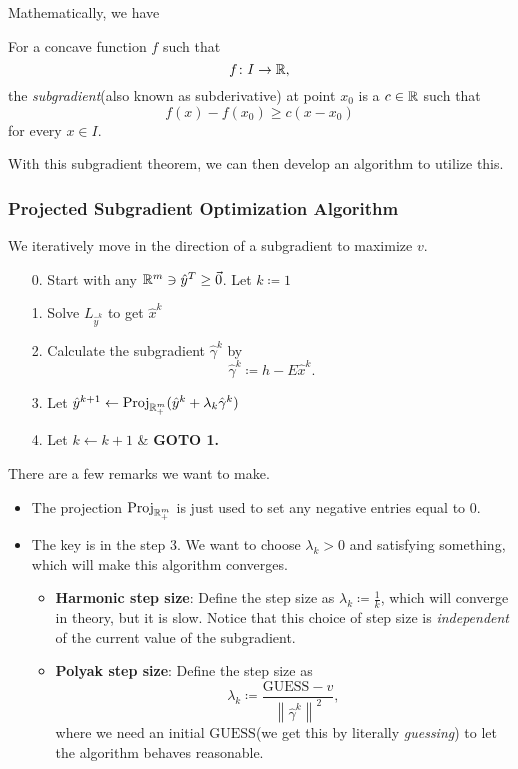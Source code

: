 Mathematically, we have
\begin{definition}
	\label{def:subgradient}
	For a concave function \(f\) such that
	\[
		f\colon I\to \mathbb{\MakeUppercase{R}},
	\]
	the \emph{subgradient}(also known as subderivative) at point \(x_0\) is a \(c\in \mathbb{\MakeUppercase{R}}\) such that
	\[
		f(x) - f(x_{0})\geq c(x - x_0)
	\]
	for every \(x\in I\).

\end{definition}

With this subgradient theorem, we can then develop an algorithm to utilize this.

\subsubsection{Projected Subgradient Optimization Algorithm}
\begin{intuition}
	We iteratively move in the direction of a subgradient to maximize \(v\).
\end{intuition}
\begin{enumerate}
	\item[0.] Start with any \(\mathbb{\MakeUppercase{R}}^m\ni \hat{y}^{T}\geq \vec{0}\). Let \(k\coloneqq 1\)
	\item[1.] Solve \(L_{\hat{y}^k}\) to get \(\hat{x}^k\)
	\item[2.] Calculate the subgradient \(\hat{\gamma}^k\) by
		\[
			\hat{\gamma}^k\coloneqq h - E \hat{x}^k.
		\]
	\item[3.] Let \(\hat{y}^{k+1}\leftarrow \mathrm{Proj}_{\mathbb{\MakeUppercase{R}}^m_+}(\hat{y}^k + \lambda_{k}\hat{\gamma}^k) \)
	\item[4.] Let \(k\leftarrow k+1\) \& \textbf{GOTO 1.}
\end{enumerate}
\begin{remark}
	There are a few remarks we want to make.
	\begin{itemize}
		\item The projection \(\mathrm{Proj}_{\mathbb{\MakeUppercase{R}}^m_+}\) is just used to set any negative entries equal to \(0\).
		\item The key is in the step 3. We want to choose \(\lambda_{k}>0\) and satisfying something, which will make this algorithm converges.
		      \begin{itemize}
			      \item \textbf{Harmonic step size}: Define the step size as \(\lambda_{k}\coloneqq \frac{1}{k}\), which will converge in theory, but it is slow. Notice that this choice of step size is \emph{independent} of the current value of the subgradient.
			      \item \textbf{Polyak step size}: Define the step size as
			            \[
				            \lambda_{k}\coloneqq \frac{\mathrm{GUESS} - v}{\left\lVert \hat{\gamma}^k\right\rVert^2 },
			            \]
			            where we need an initial \(\mathrm{GUESS}\)(we get this by literally \emph{guessing}) to let the algorithm behaves reasonable.
		      \end{itemize}
	\end{itemize}
\end{remark}